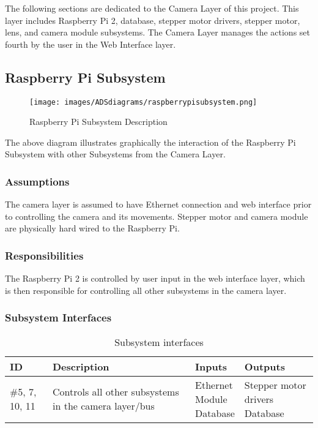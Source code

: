 The following sections are dedicated to the Camera Layer of this project. This layer includes Raspberry Pi 2, database, stepper motor drivers, stepper motor, lens, and camera module subsystems. The Camera Layer manages the actions set fourth by the user in the Web Interface layer.

\subsection{Raspberry Pi Subsystem}

\begin{figure}[h!]
	\centering
 	\texttt{[image: images/ADSdiagrams/raspberrypisubsystem.png]}
 \caption{Raspberry Pi Subsystem Description}
\end{figure}

The above diagram illustrates graphically the interaction of the Raspberry Pi Subsystem with other Subsystems from the Camera Layer.

\subsubsection{Assumptions}
The camera layer is assumed to have Ethernet connection and web interface prior to controlling the camera and its movements. Stepper motor and camera module are physically hard wired to the Raspberry Pi. 

\subsubsection{Responsibilities}
The Raspberry Pi 2 is controlled by user input in the web interface layer, which is then responsible for controlling all other subsystems in the camera layer.

\subsubsection{Subsystem Interfaces}

\begin {table}[H]
\caption {Subsystem interfaces} 
\begin{center}
    \begin{tabular}{ | p{1cm} | p{6cm} | p{3cm} | p{3cm} |}
    \hline
    ID & Description & Inputs & Outputs \\ \hline
    \#5, 7, 10, 11 & Controls all other subsystems in the camera layer/bus & \pbox{3cm}{Ethernet \\ Module \\ Database } & \pbox{3cm}{Stepper motor drivers \\ Database}  \\ \hline
   
    
    \end{tabular}
\end{center}
\end{table}



